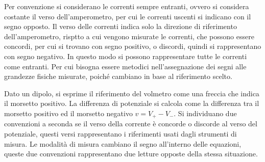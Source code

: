 \documentclass{article}
\numberwithin{equation}{subsection}
\begin{document}
Per convenzione si considerano le correnti sempre entranti, ovvero si considera costante il verso dell'amperometro, per cui le correnti uscenti si indicano con il segno 
opposto. Il verso delle correnti indica solo la direzione di riferimento dell'amperometro, risptto a cui vengono misurate le correnti, che possono essere concordi, per cui 
si trovano con segno positivo, o discordi, quindi si rappresentano con segno negativo. In questo modo si possono rappresentare tutte le correnti come entranti. Per cui bisogna 
essere metodici nell'assegnazione dei segni alle grandezze fisiche misurate, poiché cambiano in base al riferimento scelto. 

\begin{center}
\end{center}

Dato un dipolo, si esprime il riferimento del volmetro come una freccia che indica il morsetto positivo. La differenza di potenziale si calcola come la differenza tra il 
morsetto positivo ed il morsetto negativo $v=V_+-V_-$. Si individuano due convenzioni a seconda se il verso della corrente è concorde o discorde al verso del potenziale, questi 
versi rappresentano i riferimenti usati dagli strumenti di misura. Le modalità di misura cambiano il segno all'interno delle equazioni, queste due convenzioni rappresentano 
due letture opposte della stessa situazione. 

\begin{center}
\end{center}
\end{document}
